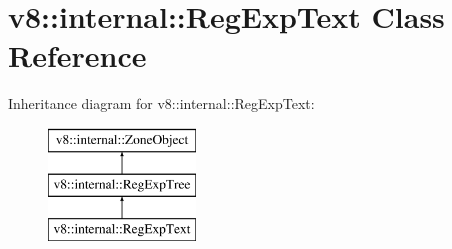 \hypertarget{classv8_1_1internal_1_1_reg_exp_text}{}\section{v8\+:\+:internal\+:\+:Reg\+Exp\+Text Class Reference}
\label{classv8_1_1internal_1_1_reg_exp_text}
Inheritance diagram for v8\+:\+:internal\+:\+:Reg\+Exp\+Text\+:\begin{figure}[H]
\begin{center}
\leavevmode
\includegraphics[height=3.000000cm]{classv8_1_1internal_1_1_reg_exp_text}
\end{center}
\end{figure}
